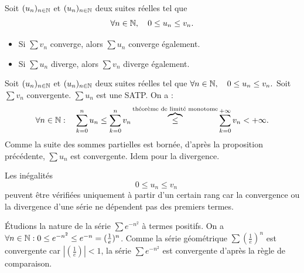 \documentclass{book}
\begin{document}
\begin{Proposition}
\label{prop:satp}
Soit $(u_n)_{n\in\mathbb{N}}$ et $(u_n)_{n\in\mathbb{N}}$ deux suites réelles tel que $$\forall n\in\mathbb{N},\quad 0\leq u_n\leq v_n.$$
\begin{itemize}
\item
  Si $\sum v_n$ converge, alors $\sum u_n$ converge également.
\item
  Si $\sum u_n$ diverge, alors $\sum v_n$ diverge également.
\end{itemize}
\end{Proposition}
\begin{Demonstration}
Soit $(u_n)_{n\in\mathbb{N}}$ et $(u_n)_{n\in\mathbb{N}}$ deux suites réelles tel que $\forall n\in\mathbb{N},\quad 0\leq u_n\leq v_n.$
Soit  $\sum v_n$ convergente. 
$\sum u_n$ est une SATP.  On a : 
$$\forall n \in \mathbb{N} : \quad \sum_{k=0}^n u_n\leq  \sum_{k=0}^n v_n \overbrace{\leq}^{\text{théorème de limité monotome}}  \sum_{k=0}^{+\infty} v_n<+\infty.$$
Comme la suite des sommes partielles est bornée, d'après la proposition précédente,  $\sum u_n$ est convergente. Idem pour la divergence.
\end{Demonstration}

\begin{Remarque}
Les inégalités $$\quad 0\leq u_n\leq v_n$$  peuvent être vérifiées uniquement à partir d'un certain rang car la convergence ou la divergence d'une série ne dépendent pas des premiers termes. 
\end{Remarque}
\begin{Exemple}
Étudions la nature de la  série $\sum e^{-n^2}$ à termes positifs. On a  $\forall n\in\mathbb{N} : 0\leq e^{-n^2}\leq e^{-n}=(\frac 1 e)^n$. Comme la série géométrique $\sum \left(\frac 1 e\right)^n$ est convergente car $|\left(\frac 1 e\right)|<1$, la série $\sum e^{-n^2}$ est convergente d'après la règle de comparaison. 
\end{Exemple}
\end{document}
